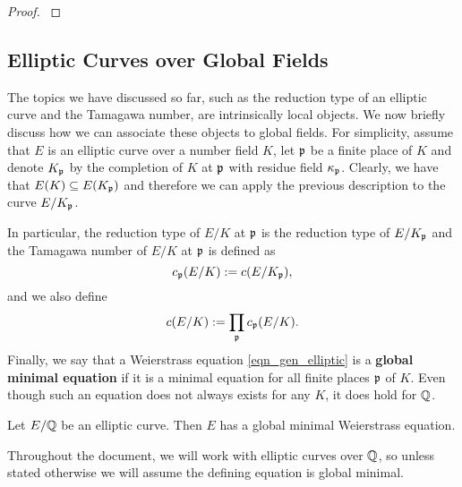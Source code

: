 \begin{proof}
    \cite[Lemma 3.22]{reg-const}
\end{proof}

\subsection{Elliptic Curves over Global Fields}

The topics we have discussed so far, such as the reduction type of an elliptic curve and the Tamagawa number, are intrinsically local objects. We now briefly discuss how we can associate these objects to global fields. For simplicity, assume that $E$ is an elliptic curve over a number field $K$, let $\mathfrak{p}$ be a finite place of $K$ and denote $K_{\mathfrak{p}}$ by the completion of $K$ at $\mathfrak{p}$ with residue field $\kappa_{\mathfrak{p}}$. Clearly, we have that $E(K)\subseteq E(K_{\mathfrak{p}})$ and therefore we can apply the previous description to the curve $E/K_{\mathfrak{p}}$.

In particular, the reduction type of $E/K$ at $\mathfrak{p}$ is the reduction type of $E/K_{\mathfrak{p}}$ and the Tamagawa number of $E/K$ at $\mathfrak{p}$ is defined as 
$$c_{\mathfrak{p}}(E/K):=c(E/K_{\mathfrak{p}}),$$
and we also define 
$$c(E/K):=\prod_{\mathfrak{p}} c_{\mathfrak{p}}(E/K).$$
Finally, we say that a Weierstrass equation \eqref{eqn_gen_elliptic} is a \textbf{global minimal equation} if it is a minimal equation for all finite places $\mathfrak{p}$ of $K$. Even though such an equation does not always exists for any $K$, it does hold for $\mathbb{Q}$.

\begin{prop}\label{prop_globmin}
    Let $E/\mathbb{Q}$ be an elliptic curve. Then $E$ has a global minimal Weierstrass equation.
\end{prop}

Throughout the document, we will work with elliptic curves over $\mathbb{Q}$, so unless stated otherwise we will assume the defining equation is global minimal.